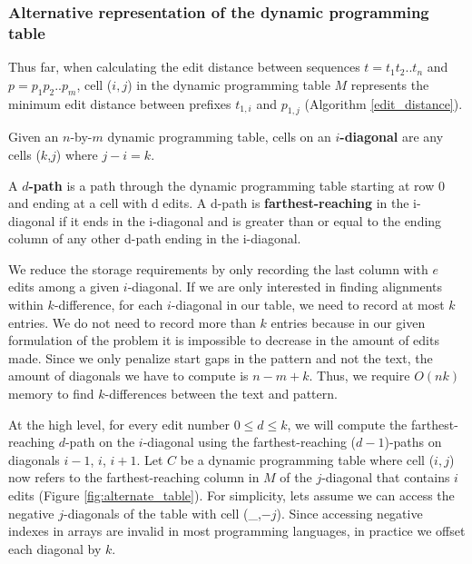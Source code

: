 \subsubsection{Alternative representation of the dynamic programming table}

Thus far, when calculating the edit distance between sequences $t = t_1 t_2 .. t_n$ and $p = p_1 p_2 .. p_m$, cell ($i,j$) in the dynamic programming table $M$ represents the minimum edit distance between prefixes $t_{1,i}$ and $p_{1,j}$ (Algorithm \ref{edit_distance}).

\begin{definition}
Given an $n$-by-$m$ dynamic programming table, cells on an {\bf $i$-diagonal} are any cells ($k$,$j$) where $j-i=k$.
\end{definition}

\begin{definition}
A {\bf $d$-path} is a path through the dynamic programming table starting at row 0 and ending at a cell with d edits.  A d-path is {\bf farthest-reaching} in the i-diagonal if it ends in the i-diagonal and is greater than or equal to the ending column of any other d-path ending in the i-diagonal.
\end{definition}

We reduce the storage requirements by only recording the last column with $e$ edits among a given $i$-diagonal.
If we are only interested in finding alignments within $k$-difference, for each $i$-diagonal in our table, we need to record at most $k$ entries.
We do not need to record more than $k$ entries because in our given formulation of the problem it is impossible to decrease in the amount of edits made.
Since we only penalize start gaps in the pattern and not the text, the amount of diagonals we have to compute is $n - m + k$.
Thus, we require $O(nk)$ memory to find $k$-differences between the text and pattern.

At the high level, for every edit number $0 \leq d \leq k$, we will compute the farthest-reaching $d$-path on the $i$-diagonal using the farthest-reaching ($d-1$)-paths on diagonals $i-1$, $i$, $i+1$.
Let $C$ be a dynamic programming table where cell ($i,j$) now refers to the farthest-reaching column in $M$ of the $j$-diagonal that contains $i$ edits (Figure \ref{fig:alternate_table}).
For simplicity, lets assume we can access the negative $j$-diagonals of the table with cell (\_,$-j$).
Since accessing negative indexes in arrays are invalid in most programming languages, in practice we offset each diagonal by $k$.

